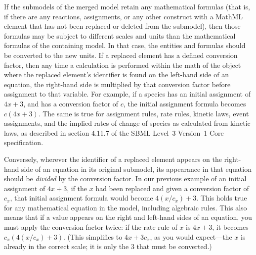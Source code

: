 If the submodels of the merged model retain any mathematical formulas
(that is, if there are any reactions, assignments, or any other
construct with a MathML  element that has not been
replaced or deleted from the submodel), then those formulas may be
subject to different scales and units than the mathematical formulas of
the containing model.  In that case, the entities and formulas should be
converted to the new units.  If a replaced element has a defined
conversion factor, then any time a calculation is performed within the
math of the \Submodel object where the replaced element's identifier is
found on the left-hand side of an equation, the right-hand side is
multiplied by that conversion factor before assignment to that variable.
For example, if a species has an initial assignment of $4x + 3$, and has
a conversion factor of $c$, the initial assignment formula becomes
$c (4x+3)$.  The same is true for assignment rules, rate
rules, kinetic laws, event assignments, and the implied rates of change
of species as calculated from kinetic laws, as described in section
4.11.7 of the SBML Level~3 Version~1 Core specification.

Conversely, wherever the identifier of a replaced element appears on the
right-hand side of an equation in its original submodel, its appearance
in that equation should be \emph{divided} by the conversion factor.  In
our previous example of an initial assignment of $4x+3$, if the $x$ had
been replaced and given a conversion factor of $c_x$, that initial
assignment formula would become $4(x/c_x)+3$.  This holds true for any
mathematical equation in the model, including algebraic rules.  This
also means that if a value appears on the right and left-hand sides of
an equation, you must apply the conversion factor twice: if the rate
rule of $x$ is $4x+3$, it becomes $c_x(4(x/c_x) + 3)$.  (This
simplifies to $4x + 3c_x$, as you would expect---the $x$ is already in
the correct scale; it is only the 3 that must be converted.)



